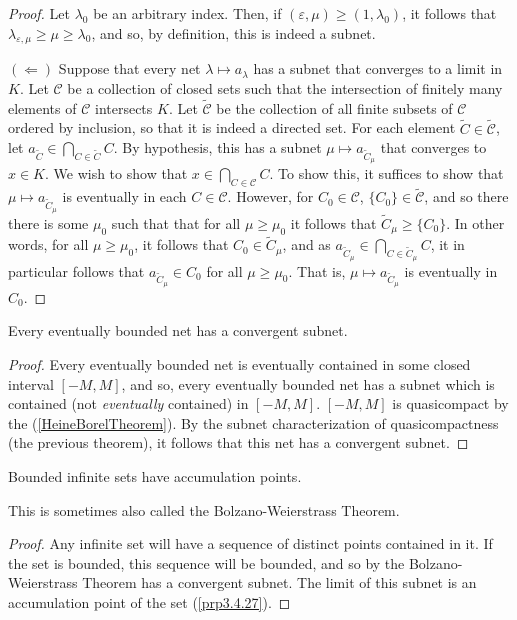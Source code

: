 \begin{thm}
\begin{proof}
Let $\lambda _0$ be an arbitrary index.  Then, if $(\varepsilon ,\mu )\geq (1,\lambda _0)$, it follows that $\lambda _{\varepsilon ,\mu}\geq \mu \geq \lambda _0$, and so, by definition, this is indeed a subnet.

\blankline
\noindent
$(\Leftarrow )$ Suppose that every net $\lambda \mapsto a_\lambda$ has a subnet that converges to a limit in $K$.  Let $\mathcal{C}$ be a collection of closed sets such that the intersection of finitely many elements of $\mathcal{C}$ intersects $K$.  Let $\tilde{\mathcal{C}}$ be the collection of all finite subsets of $\mathcal{C}$ ordered by inclusion, so that it is indeed a directed set.  For each element $\tilde{C}\in \tilde{\mathcal{C}}$, let $a_{\tilde{C}}\in \bigcap _{C\in \tilde{C}}C$.  By hypothesis, this has a subnet $\mu \mapsto a_{\tilde{C}_\mu}$ that converges to $x\in K$.  We wish to show that $x\in \bigcap _{C\in \mathcal{C}}C$.  To show this, it suffices to show that $\mu \mapsto a_{\tilde{C}_\mu}$ is eventually in each $C\in \mathcal{C}$.  However, for $C_0\in \mathcal{C}$, $\{ C_0\} \in \tilde{\mathcal{C}}$, and so there there is some $\mu _0$ such that that for all $\mu \geq \mu _0$ it follows that $\tilde{C}_\mu \geq \{ C_0\}$.  In other words, for all $\mu \geq \mu _0$, it follows that $C_0\in \tilde{C}_\mu$, and as $a_{\tilde{C}_\mu}\in \bigcap _{C\in \tilde{C}_\mu}C$, it in particular follows that $a_{\tilde{C}_\mu}\in C_0$ for all $\mu \geq \mu _0$.  That is, $\mu \mapsto a_{\tilde{C}_\mu}$ is eventually in $C_0$.
\end{proof}
\end{thm}
\begin{crl}\label{BolzanoWeierstrassTheorem}
Every eventually bounded net has a convergent subnet.
\begin{proof}
Every eventually bounded net is eventually contained in some closed interval $[-M,M]$, and so, every eventually bounded net has a subnet which is contained (not \emph{eventually} contained) in $[-M,M]$.  $[-M,M]$ is quasicompact by the  (\cref{HeineBorelTheorem}).  By the subnet characterization of quasicompactness (the previous theorem), it follows that this net has a convergent subnet.
\end{proof}
\end{crl}
\begin{crl}
Bounded infinite sets have accumulation points.
\begin{rmk}
This is sometimes also called the Bolzano-Weierstrass Theorem.
\end{rmk}
\begin{proof}
Any infinite set will have a sequence of distinct points contained in it.  If the set is bounded, this sequence will be bounded, and so by the Bolzano-Weierstrass Theorem has a convergent subnet.  The limit of this subnet is an accumulation point of the set (\cref{prp3.4.27}).
\end{proof}
\end{crl}

